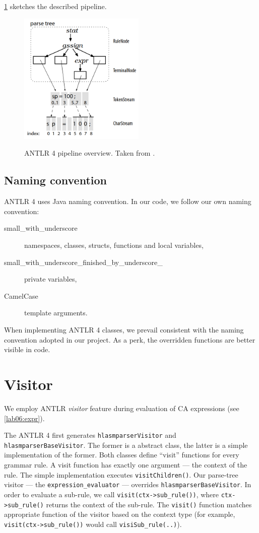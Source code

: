 \cref{antlr_pipeline} sketches the described pipeline.

\begin{figure}[H]
	\centering
	\includegraphics[width=6cm]{img/antlr_pipeline}
	\label{antlr_pipeline}
	\caption{ANTLR 4 pipeline overview. Taken from \cite{parr2013definitive}.}
\end{figure}

\subsection{Naming convention}
ANTLR 4 uses Java naming convention. In our code, we follow our own naming convention:

\begin{description}
	\item[small\_with\_underscore] namespaces, classes, structs, functions and local variables,
	\item[small\_with\_underscore\_finished\_by\_underscore\_] private variables,
	\item[CamelCase] template arguments.
\end{description} 

When implementing ANTLR 4 classes, we prevail consistent with the naming convention adopted in our project. As a perk, the overridden functions are better visible in code.

\section{Visitor}

We employ ANTLR \emph{visitor} feature during evaluation of CA expressions (see \cref{lab06:expr}). 

The ANTLR 4 first generates \texttt{hlasmparserVisitor} and \texttt{hlasmparserBaseVisitor}. The former is a abstract class, the latter is a simple implementation of the former. Both classes define ``visit'' functions for every grammar rule. A visit function has exactly one argument --- the context of the rule. The simple implementation executes \texttt{visitChildren()}. Our parse-tree visitor --- the \texttt{expression\_evaluator} --- overrides \texttt{hlasmparserBaseVisitor}. In order to evaluate a sub-rule, we call \texttt{visit(ctx->sub\_rule())}, where \texttt{ctx->sub\_rule()} returns the context of the sub-rule. The \texttt{visit()} function matches appropriate function of the visitor based on the context type (for example, \texttt{visit(ctx->sub\_rule())} would call \texttt{visiSub\_rule(..)}).

